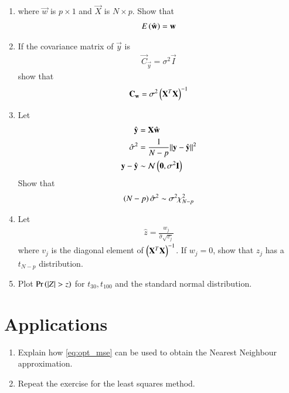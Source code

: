 \documentclass[journal,12pt,twocolumn]{IEEEtran}
\renewcommand\thesection{\arabic{section}}
\begin{document}
\begin{enumerate}[label=\thesection.\arabic*
,ref=\thesection.\theenumi]
\item 
where $\vec{w}$ is $p \times 1$ and $\vec{X}$ is $N \times p$.  Show that
\begin{align}
E\left(\hat{\mathbf{w}}\right) = \mathbf{w}
\end{align}
%
\item If the covariance matrix of $\vec{y}$ is
\begin{align}
\vec{C}_{\vec{y}} = \sigma^2\vec{I}
\end{align}
show that
\begin{align}
\mathbf{C}_{\mathbf{w}} = \sigma^2\left(\mathbf{X}^T\mathbf{X}\right)^{-1}
\end{align}
%
\item Let
%
\begin{align}
\hat{\mathbf{y}} &= \mathbf{X}\hat{\mathbf{w}}
\\
\hat{\sigma}^2 &= \frac{1}{N-p}\lVert\mathbf{y}-\hat{\mathbf{y}}\rVert^2
\\
\mathbf{y}-\hat{\mathbf{y}} &\sim \mathcal{N}\left(\mathbf{0}, \sigma^2\mathbf{I}\right)
\end{align}
%
Show that
\begin{align}
\left(N-p\right)\hat{\sigma}^2 \sim \sigma^2\chi_{N-p}^2
\end{align}
\item Let 
\begin{align}
\hat{z}=\frac{w_j}{\hat{\sigma}\sqrt{v_j}}
\end{align}
%
where $v_j$ is the diagonal element of $\left(\mathbf{X}^T\mathbf{X}\right)^{-1}$.  
If $w_j= 0$,  show 
that $z_j$ has a $t_{N-p}$ distribution.
\item Plot $\Pr\left(\left\vert Z\right\vert>z\right)$ for $t_{30}, t_{100}$ and the standard normal 
distribution.
\end{enumerate}
\section{Applications}
\begin{enumerate}[label=\thesection.\arabic*
,ref=\thesection.\theenumi]
\item Explain how \eqref{eq:opt_mse} can be used to obtain the  Nearest 
Neighbour approximation.
\item Repeat the exercise for the least squares method.
\end{enumerate}
%
\end{document}
